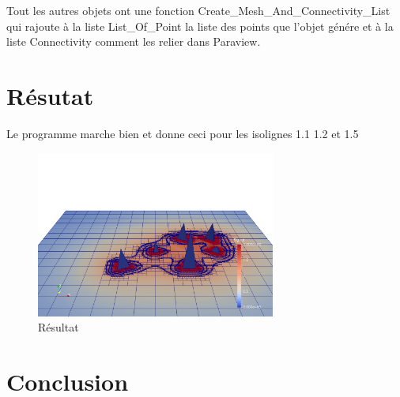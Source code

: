 \documentclass[french]{article}
\begin{document}
Tout les autres objets ont une fonction Create\_Mesh\_And\_Connectivity\_List qui rajoute à la liste List\_Of\_Point la liste des points
que l'objet génére et à la liste Connectivity comment les relier dans Paraview.

\section{Résutat}
Le programme marche bien et donne ceci pour les isolignes 1.1 1.2 et 1.5

\begin{figure}[h]
	\centering
	\includegraphics[width=0.7\textwidth]{Figures/FinalWhite2.png}
	\caption{Résultat}
\end{figure}

\section{Conclusion}
\end{document}

